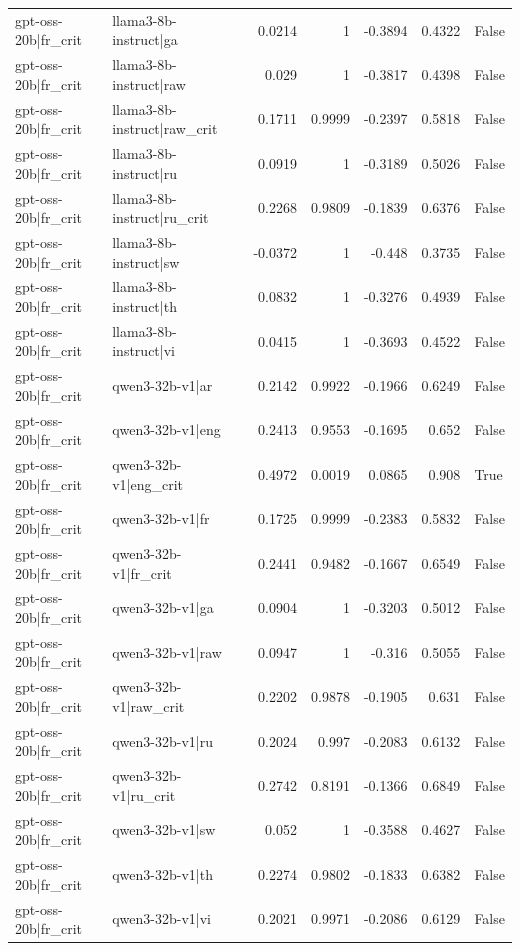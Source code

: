 \begin{table}
\begin{tabular}{l l r r r r l}
gpt-oss-20b|fr_crit & llama3-8b-instruct|ga & 0.0214 & 1 & -0.3894 & 0.4322 & False \\
gpt-oss-20b|fr_crit & llama3-8b-instruct|raw & 0.029 & 1 & -0.3817 & 0.4398 & False \\
gpt-oss-20b|fr_crit & llama3-8b-instruct|raw_crit & 0.1711 & 0.9999 & -0.2397 & 0.5818 & False \\
gpt-oss-20b|fr_crit & llama3-8b-instruct|ru & 0.0919 & 1 & -0.3189 & 0.5026 & False \\
gpt-oss-20b|fr_crit & llama3-8b-instruct|ru_crit & 0.2268 & 0.9809 & -0.1839 & 0.6376 & False \\
gpt-oss-20b|fr_crit & llama3-8b-instruct|sw & -0.0372 & 1 & -0.448 & 0.3735 & False \\
gpt-oss-20b|fr_crit & llama3-8b-instruct|th & 0.0832 & 1 & -0.3276 & 0.4939 & False \\
gpt-oss-20b|fr_crit & llama3-8b-instruct|vi & 0.0415 & 1 & -0.3693 & 0.4522 & False \\
gpt-oss-20b|fr_crit & qwen3-32b-v1|ar & 0.2142 & 0.9922 & -0.1966 & 0.6249 & False \\
gpt-oss-20b|fr_crit & qwen3-32b-v1|eng & 0.2413 & 0.9553 & -0.1695 & 0.652 & False \\
gpt-oss-20b|fr_crit & qwen3-32b-v1|eng_crit & 0.4972 & 0.0019 & 0.0865 & 0.908 & True \\
gpt-oss-20b|fr_crit & qwen3-32b-v1|fr & 0.1725 & 0.9999 & -0.2383 & 0.5832 & False \\
gpt-oss-20b|fr_crit & qwen3-32b-v1|fr_crit & 0.2441 & 0.9482 & -0.1667 & 0.6549 & False \\
gpt-oss-20b|fr_crit & qwen3-32b-v1|ga & 0.0904 & 1 & -0.3203 & 0.5012 & False \\
gpt-oss-20b|fr_crit & qwen3-32b-v1|raw & 0.0947 & 1 & -0.316 & 0.5055 & False \\
gpt-oss-20b|fr_crit & qwen3-32b-v1|raw_crit & 0.2202 & 0.9878 & -0.1905 & 0.631 & False \\
gpt-oss-20b|fr_crit & qwen3-32b-v1|ru & 0.2024 & 0.997 & -0.2083 & 0.6132 & False \\
gpt-oss-20b|fr_crit & qwen3-32b-v1|ru_crit & 0.2742 & 0.8191 & -0.1366 & 0.6849 & False \\
gpt-oss-20b|fr_crit & qwen3-32b-v1|sw & 0.052 & 1 & -0.3588 & 0.4627 & False \\
gpt-oss-20b|fr_crit & qwen3-32b-v1|th & 0.2274 & 0.9802 & -0.1833 & 0.6382 & False \\
gpt-oss-20b|fr_crit & qwen3-32b-v1|vi & 0.2021 & 0.9971 & -0.2086 & 0.6129 & False \\

\end{tabular}
\end{table}
